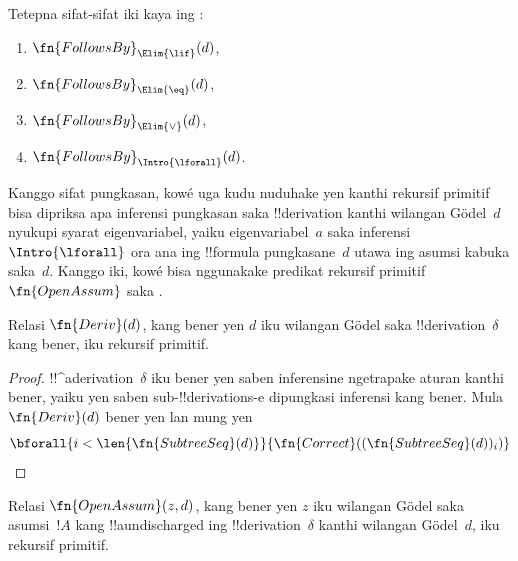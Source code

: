 \documentclass[../../../include/open-logic-section]{subfiles}
\begin{document}
\begin{prob}
  Tetepna sifat-sifat iki kaya ing
  :
  \begin{enumerate}
  \item $\fn{FollowsBy}_{\Elim{\lif}}(d)$,
  \item $\fn{FollowsBy}_{\Elim{\eq}}(d)$,
  \item $\fn{FollowsBy}_{\Elim{\lor}}(d)$,
  \item $\fn{FollowsBy}_{\Intro{\lforall}}(d)$.
  \end{enumerate}
  Kanggo sifat pungkasan, kowé uga kudu nuduhake yen kanthi
  rekursif primitif bisa dipriksa apa inferensi pungkasan saka
  !!{derivation} kanthi wilangan G\"odel~$d$ nyukupi syarat
  eigenvariabel, yaiku eigenvariabel~$a$ saka inferensi
  $\Intro{\lforall}$ ora ana ing !!{formula} pungkasane~$d$
  utawa ing asumsi kabuka saka~$d$. Kanggo iki, kowé bisa
  nggunakake predikat rekursif primitif $\fn{OpenAssum}$ saka
  .
\end{prob}

\begin{prop}
  Relasi $\fn{Deriv}(d)$, kang bener yen $d$ iku wilangan G\"odel
  saka !!{derivation}~$\delta$ kang bener, iku rekursif primitif.
\end{prop}

\begin{proof}
  !!^a{derivation}~$\delta$ iku bener yen saben inferensine
  ngetrapake aturan kanthi bener, yaiku yen saben
  sub-!!{derivation}s-e dipungkasi inferensi kang bener.
  Mula $\fn{Deriv}(d)$ bener yen lan mung yen
  \[
  \bforall{i<\len{\fn{SubtreeSeq}(d)}}{\fn{Correct}((\fn{SubtreeSeq}(d))_i)}
  \]
\end{proof}

\begin{prop}
   Relasi $\fn{OpenAssum}(z, d)$,
  kang bener yen $z$ iku wilangan G\"odel saka asumsi~$!A$
  kang !!a{undischarged} ing !!{derivation}~$\delta$ kanthi
  wilangan G\"odel~$d$, iku rekursif primitif.
\end{prop}
\end{document}
